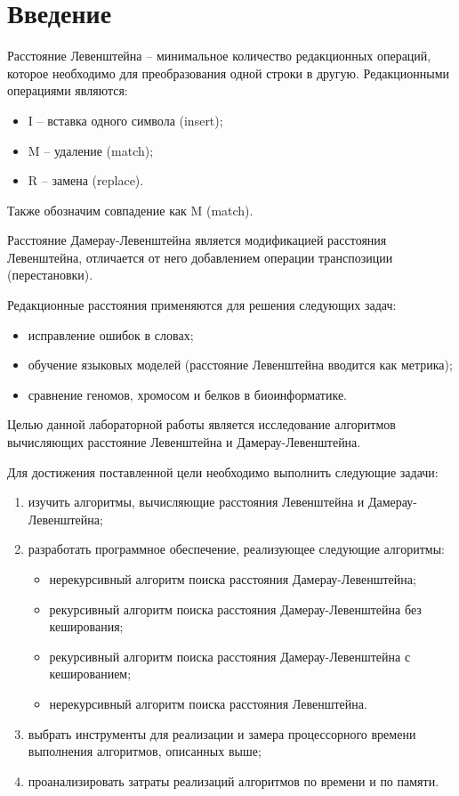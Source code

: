 \chapter*{Введение}

Расстояние Левенштейна -- минимальное количество редакционных операций, которое необходимо для преобразования одной строки в другую. Редакционными операциями являются: 
\begin{itemize}
	\item I -- вставка одного символа (insert);
	\item M -- удаление (match);
	\item R -- замена (replace).
\end{itemize}
Также обозначим совпадение как M (match).

Расстояние Дамерау-Левенштейна является модификацией расстояния Левенштейна, отличается от него добавлением операции транспозиции (перестановки).  

Редакционные расстояния применяются для решения следующих задач:
\begin{itemize}
	\item исправление ошибок в словах;
	\item обучение языковых моделей (расстояние Левенштейна вводится как метрика);
	\item сравнение геномов, хромосом и белков в биоинформатике.
\end{itemize}

Целью данной лабораторной работы является исследование алгоритмов вычисляющих расстояние Левенштейна и Дамерау-Левенштейна.

Для достижения поставленной цели необходимо выполнить следующие задачи:
\begin{enumerate}
	\item изучить алгоритмы, вычисляющие расстояния Левенштейна и Дамерау-Левенштейна;
	\item разработать программное обеспечение, реализующее следующие алгоритмы:
	\begin{itemize}
		\item нерекурсивный алгоритм поиска расстояния Дамерау-Левенштейна;
		\item рекурсивный алгоритм поиска расстояния Дамерау-Левенштейна без кеширования;
		\item рекурсивный алгоритм поиска расстояния Дамерау-Левенштейна с кешированием;
		\item нерекурсивный алгоритм поиска расстояния Левенштейна.
	\end{itemize}
	\item выбрать инструменты для реализации и замера процессорного времени выполнения алгоритмов, описанных выше;
	\item проанализировать затраты реализаций алгоритмов по времени и по памяти.
\end{enumerate}
